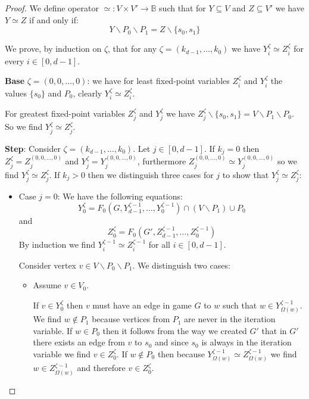 \begin{theorem}
\begin{proof}
		
		We define operator $\simeq : V \times V' \rightarrow \mathbb{B}$ such that for $Y \subseteq V$ and $Z \subseteq V'$ we have $Y \simeq Z$ if and only if:
		\[ Y \backslash P_0 \backslash P_1 = Z \backslash \{s_0,s_1\}\]
		
		We prove, by induction on $\zeta$, that for any $\zeta = (k_{d-1},\dots,k_0)$ we have $Y_i^{\zeta} \simeq Z_i^{\zeta}$ for every $i \in [0,d-1]$.
	
		
		\textbf{Base} $\zeta = (0,0,\dots,0)$: we have for least fixed-point variables $Z_i^\zeta$ and $Y_i^{\zeta}$ the values $\{s_0\}$ and $P_0$, clearly $Y_i^\zeta \simeq Z_i^{\zeta}$. 
		
		For greatest fixed-point variables $Z_j^\zeta$ and $Y_j^{\zeta}$ we have $Z_j^\zeta \backslash \{s_0,s_1\} = V \backslash P_1 \backslash P_0$. So we find $Y_j^\zeta \simeq Z_j^{\zeta}$.
		
		\textbf{Step}: Consider $\zeta = (k_{d-1},\dots,k_0)$. Let $j \in [0,d-1]$. If $k_j = 0$ then $Z_j^\zeta = Z_j^{(0,0,\dots,0)}$ and $Y_j^{\zeta} = Y_j^{(0,0,\dots,0)}$, furthermore $Z_j^{(0,0,\dots,0)}\simeq Y_j^{(0,0,\dots,0)}$ so we find $Y_j^{\zeta} \simeq Z_j^{\zeta}$.
		If $k_j > 0$ then we distinguish three cases for $j$ to show that $Y_j^{\zeta} \simeq Z_j^{\zeta}$:
		\begin{itemize}
			\item Case $j=0$: We have the following equations:
			\[ Y_0^{\zeta} = F_0(G,Y_{d-1}^{\zeta-1},\dots,Y_0^{\zeta-1}) \cap (V\backslash P_1) \cup P_0 \]
			and
			\[ Z_0^{\zeta} = F_0(G',Z_{d-1}^{\zeta-1},\dots,Z_0^{\zeta-1}) \]
			By induction we find $Y_i^{\zeta-1} \simeq Z_i^{\zeta-1}$ for all $i \in [0,d-1]$.
			
			
			Consider vertex $v \in V\backslash P_0 \backslash P_1$. We distinguish two cases:
			\begin{itemize}
				\item Assume $v \in V_0$.
				
				If $v \in Y_0^{\zeta}$ then $v$ must have an edge in game $G$ to $w$ such that $w\in Y^{\zeta-1}_{\Omega(w)}$. We find $w \notin P_1$ because vertices from $P_1$ are never in the iteration variable. If $w \in P_0$ then it follows from the way we created $G'$ that in $G'$ there exists an edge from $v$ to $s_0$ and since $s_0$ is always in the iteration variable we find $v \in Z_0^{\zeta}$. If $w \notin P_0$ then because $Y^{\zeta-1}_{\Omega(w)} \simeq Z^{\zeta-1}_{\Omega(w)}$ we find $w \in Z^{\zeta-1}_{\Omega(w)}$ and therefore $v \in Z_0^{\zeta}$.
				

\end{itemize}
\end{itemize}
\end{proof}
\end{theorem}
